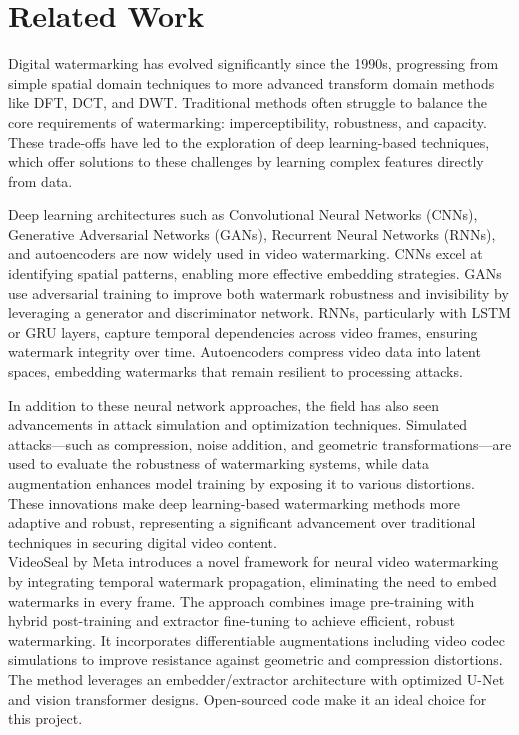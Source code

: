 \documentclass[12pt, technote]{IEEEtran}
\begin{document}
\section{Related Work}
Digital watermarking has evolved significantly since the 1990s, progressing from simple spatial domain techniques to more advanced transform domain methods like DFT, DCT, and DWT. Traditional methods often struggle to balance the core requirements of watermarking: imperceptibility, robustness, and capacity. These trade-offs have led to the exploration of deep learning-based techniques, which offer solutions to these challenges by learning complex features directly from data.

Deep learning architectures such as Convolutional Neural Networks (CNNs), Generative Adversarial Networks (GANs), Recurrent Neural Networks (RNNs), and autoencoders are now widely used in video watermarking. CNNs excel at identifying spatial patterns, enabling more effective embedding strategies. GANs use adversarial training to improve both watermark robustness and invisibility by leveraging a generator and discriminator network. RNNs, particularly with LSTM or GRU layers, capture temporal dependencies across video frames, ensuring watermark integrity over time. Autoencoders compress video data into latent spaces, embedding watermarks that remain resilient to processing attacks.

In addition to these neural network approaches, the field has also seen advancements in attack simulation and optimization techniques. Simulated attacks—such as compression, noise addition, and geometric transformations—are used to evaluate the robustness of watermarking systems, while data augmentation enhances model training by exposing it to various distortions. These innovations make deep learning-based watermarking methods more adaptive and robust, representing a significant advancement over traditional techniques in securing digital video content.\cite{mansour}\\
VideoSeal by Meta introduces a novel framework for neural video watermarking by integrating temporal watermark propagation, eliminating the need to embed watermarks in every frame. The approach combines image pre-training with hybrid post-training and extractor fine-tuning to achieve efficient, robust watermarking. It incorporates differentiable augmentations including video codec simulations to improve resistance against geometric and compression distortions. The method leverages an embedder/extractor architecture with optimized U-Net and vision transformer designs. Open-sourced code make it an ideal choice for this project.\cite{videoseal}
\end{document}
